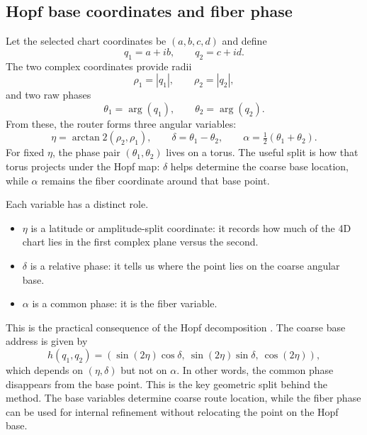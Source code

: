 \documentclass[10pt,letterpaper]{article}
\begin{document}
\subsection{Hopf base coordinates and fiber phase}
Let the selected chart coordinates be $(a,b,c,d)$ and define
\begin{equation}
q_1 = a + ib, \qquad q_2 = c + id.
\end{equation}
The two complex coordinates provide radii
\begin{equation}
\rho_1 = |q_1|, \qquad \rho_2 = |q_2|,
\end{equation}
and two raw phases
\begin{equation}
\theta_1 = \arg(q_1), \qquad \theta_2 = \arg(q_2).
\end{equation}
From these, the router forms three angular variables:
\begin{equation}
\eta = \arctan2(\rho_2,\rho_1), \qquad
\delta = \theta_1 - \theta_2, \qquad
\alpha = \tfrac{1}{2}(\theta_1+\theta_2).
\label{eq:hopfcoords}
\end{equation}
For fixed $\eta$, the phase pair $(\theta_1,\theta_2)$ lives on a torus. The useful split is how that torus projects under the Hopf map: $\delta$ helps determine the coarse base location, while $\alpha$ remains the fiber coordinate around that base point.

Each variable has a distinct role.
\begin{itemize}
\item $\eta$ is a latitude or amplitude-split coordinate: it records how much of the 4D chart lies in the first complex plane versus the second.
\item $\delta$ is a relative phase: it tells us where the point lies on the coarse angular base.
\item $\alpha$ is a common phase: it is the fiber variable.
\end{itemize}

This is the practical consequence of the Hopf decomposition \citep{hopfibration}. The coarse base address is given by
\begin{equation}
h(q_1,q_2) = \left(\sin(2\eta)\cos\delta,\ \sin(2\eta)\sin\delta,\ \cos(2\eta)\right),
\label{eq:hopfmap}
\end{equation}
which depends on $(\eta,\delta)$ but not on $\alpha$. In other words, the common phase disappears from the base point. This is the key geometric split behind the method. The base variables determine coarse route location, while the fiber phase can be used for internal refinement without relocating the point on the Hopf base.
\end{document}
